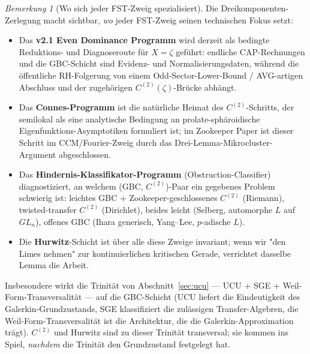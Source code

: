 \documentclass[11pt]{article}
\theoremstyle{definition}
\theoremstyle{remark}
\newtheorem{remark}[theorem]{Bemerkung}
\begin{document}
\begin{remark}[Wo sich jeder FST-Zweig spezialisiert]
\label{rem:three-component-specialisation}
Die Dreikomponenten-Zerlegung macht sichtbar, \emph{wo} jeder FST-Zweig seinen
technischen Fokus setzt:
\begin{itemize}
\item Das \textbf{v2.1 Even Dominance Programm} \cite{Geiger2026RHII}
wird derzeit als bedingte Reduktions- und Diagnoseroute für
$X = \zeta$ geführt: endliche CAP-Rechnungen und die GBC-Schicht sind
Evidenz- und Normalisierungsdaten, während die öffentliche RH-Folgerung
von einem Odd-Sector-Lower-Bound / AVG-artigen Abschluss und der
zugehörigen $C^{(2)}(\zeta)$-Brücke abhängt.
\item Das \textbf{Connes-Programm} \cite{Connes2026,ConnesConsaniMoscovici2025}
ist die natürliche Heimat des $C^{(2)}$-Schritts, der semilokal als eine analytische
Bedingung an prolate-sphäroidische Eigenfunktions-Asymptotiken formuliert ist;
im Zookeeper Paper ist dieser Schritt im CCM/Fourier-Zweig durch das Drei-Lemma-Mikrocluster-Argument
abgeschlossen.
\item Das \textbf{Hindernis-Klassifikator-Programm} (Obstruction-Classifier)
\cite{GeigerObstructionClassifiers} diagnostiziert, an welchem
(GBC, $C^{(2)}$)-Paar ein gegebenes Problem schwierig ist: leichtes GBC +
Zookeeper-geschlossenes $C^{(2)}$ (Riemann), twisted-transfer
$C^{(2)}$ (Dirichlet), beides leicht (Selberg, automorphe
$L$ auf $GL_n$), offenes GBC (Ihara generisch, Yang--Lee, $p$-adische
$L$).
\item Die \textbf{Hurwitz}-Schicht ist über alle diese Zweige invariant; wenn wir
"den Limes nehmen" zur kontinuierlichen kritischen Gerade, verrichtet dasselbe
Lemma die Arbeit.
\end{itemize}
Insbesondere wirkt die Trinität von Abschnitt~\ref{sec:ucu} --- UCU + SGE +
Weil-Form-Transversalität --- auf die GBC-Schicht (UCU liefert die
Eindeutigkeit des Galerkin-Grundzustands, SGE klassifiziert die zulässigen
Transfer-Algebren, die Weil-Form-Transversalität ist die Architektur,
die die Galerkin-Approximation trägt). $C^{(2)}$ und Hurwitz sind zu dieser Trinität
transversal; sie kommen ins Spiel, \emph{nachdem} die Trinität den
Grundzustand festgelegt hat.
\end{remark}
\end{document}
